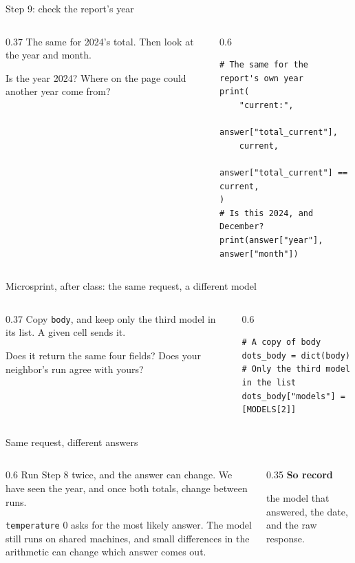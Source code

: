 \documentclass[9pt,aspectratio=169]{beamer}
\begin{document}
\begin{frame}[fragile]{Step 9: check the report's year}
    \begin{columns}[T]
        \begin{column}{0.37\textwidth}
            The same for 2024's total. Then look at the year and month.

            \medskip
            Is the year 2024? Where on the page could another year come from?
        \end{column}
        \begin{column}{0.6\textwidth}
\begin{lstlisting}
# The same for the report's own year
print(
    "current:",
    answer["total_current"],
    current,
    answer["total_current"] == current,
)
# Is this 2024, and December?
print(answer["year"], answer["month"])
\end{lstlisting}
        \end{column}
    \end{columns}
\end{frame}

\begin{frame}[fragile]{Microsprint, after class: the same request, a different model}
    \begin{columns}[T]
        \begin{column}{0.37\textwidth}
            Copy \texttt{body}, and keep only the third model in its list. A given cell sends it.

            \medskip
            Does it return the same four fields? Does your neighbor's run agree with yours?
        \end{column}
        \begin{column}{0.6\textwidth}
\begin{lstlisting}
# A copy of body
dots_body = dict(body)
# Only the third model in the list
dots_body["models"] = [MODELS[2]]
\end{lstlisting}
        \end{column}
    \end{columns}
\end{frame}

\begin{frame}{Same request, different answers}
    \begin{columns}[T]
        \begin{column}{0.6\textwidth}
            Run Step 8 twice, and the answer can change. We have seen the year, and once both totals, change between runs.

            \medskip
            \texttt{temperature} 0 asks for the most likely answer. The model still runs on shared machines, and small differences in the arithmetic can change which answer comes out.
        \end{column}
        \begin{column}{0.35\textwidth}
            \textbf{So record}\\[2pt]
            {\footnotesize the model that answered, the date, and the raw response.\par}
        \end{column}
    \end{columns}
\end{frame}
\end{document}
